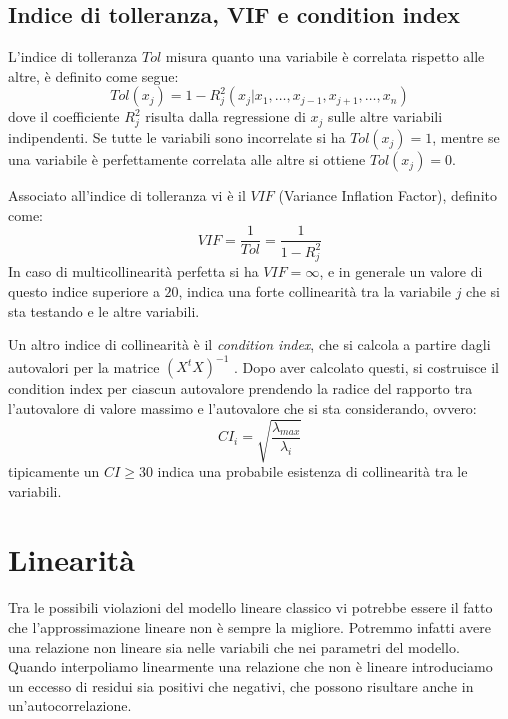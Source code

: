 \subsection{Indice di tolleranza, VIF e condition index}
L’indice di tolleranza $Tol$ misura quanto una variabile è correlata rispetto alle altre, è definito come segue:
\begin{equation}
	Tol(x_j) = 1 - R_j^2 (x_j \vert x_1 , \dots, x_{j-1} , x_{j+1} , \dots , x_n )
\end{equation}
dove il coefficiente $R_j^2$ risulta dalla regressione di $x_j$ sulle altre variabili indipendenti.
Se tutte le variabili sono incorrelate si ha $Tol(x_j) = 1$, mentre se una variabile è perfettamente correlata alle altre si ottiene $Tol(x_j) = 0$.

Associato all’indice di tolleranza vi è il $VIF$ (Variance Inflation Factor), definito come:
\begin{equation}
	VIF = \frac{1}{Tol} = \frac{1}{1 - R_j^2}
\end{equation}
In caso di multicollinearità perfetta si ha $VIF = \infty$, e in generale un valore di questo indice superiore a $20$, indica una forte collinearità tra la variabile $j$ che si sta testando e le altre variabili. 

Un altro indice di collinearità è il \textit{condition index}, che si calcola a partire dagli autovalori per la matrice $(X^t X)^{-1}$ . Dopo aver calcolato questi, si costruisce il condition index per ciascun autovalore prendendo la radice del rapporto tra l’autovalore di valore massimo e l’autovalore che si sta considerando, ovvero:
\begin{equation}
	CI_i = \sqrt{\frac{\lambda_{max}}{\lambda_i}}
\end{equation}
tipicamente un $CI \geq 30$ indica una probabile esistenza di collinearità tra le variabili.

\section{Linearità}
Tra le possibili violazioni del modello lineare classico vi potrebbe essere il fatto che l'approssimazione lineare non è sempre la migliore. Potremmo infatti avere una relazione non lineare sia nelle variabili che nei parametri del modello. Quando interpoliamo linearmente una relazione che non è lineare introduciamo un eccesso di residui sia positivi che negativi, che possono risultare anche in un'autocorrelazione.

